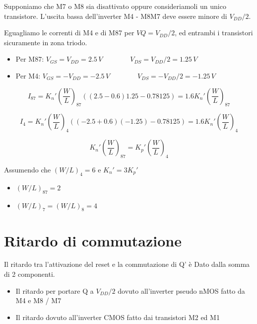 Supponiamo che M7 o M8 sia disattivato oppure consideriamoli un unico transistore. L'uscita bassa dell'inverter M4
- M8M7 deve essere minore di $V_{DD}/2$.

Eguagliamo le correnti di M4 e di M87 per $VQ = V_{DD}/2$, ed entrambi i transistori sicuramente in zona triodo.

\begin{itemize}
    \item[] Per M87: $V_{GS} = V_{DD} = 2.5\,V \qquad \qquad V_{DS} = V_{DD}/2 = 1.25\,V$
    \item[] Per M4: $V_{GS} = -V_{DD} = -2.5\,V \qquad \qquad V_{DS} = -V_{DD}/2 = -1.25\,V$
\end{itemize}

\begin{equation*}
    I_{87} = K_n'(\frac{W}{L})_{87}((2.5 - 0.6)1.25 - 0.78125) = 1.6K_n'(\frac{W}{L})_{87}
\end{equation*}

\begin{equation*}
    I_{4} = K_n'(\frac{W}{L})_{4}((-2.5 + 0.6)(-1.25) - 0.78125) = 1.6K_n'(\frac{W}{L})_{4}
\end{equation*}

\begin{equation*}
    K_n'(\frac{W}{L})_{87} = K_p'(\frac{W}{L})_4
\end{equation*}

Assumendo che $(W/L)_4 = 6 $ e $K_n' = 3K_p'$

\begin{itemize}
    \item[] $(W/L)_{87} = 2$
    \item[] $(W/L)_{7} = (W/L)_{8} = 4$
\end{itemize}

\newpage
\section{Ritardo di commutazione}

Il ritardo tra l'attivazione del reset e la commutazione di Q' è Dato dalla somma di 2 componenti.

\begin{itemize}
    \item Il ritardo per portare Q a $V_{DD}/ 2$  dovuto all'inverter pseudo nMOS fatto da M4 e M8 / M7
    \item Il ritardo dovuto all'inverter CMOS fatto dai transistori M2 ed M1
\end{itemize}


